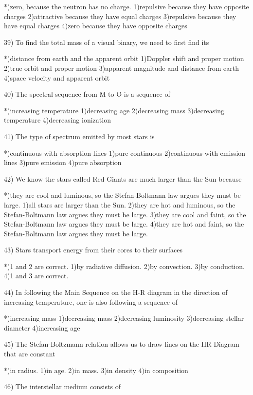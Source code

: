  *)zero, because the neutron has no charge.  
 1)repulsive because they have opposite charges
 2)attractive because they have equal charges
 3)repulsive because they have equal charges
 4)zero because they have opposite charges
 
39) To find the total mass of a visual binary, we need to first find its
 
 *)distance from earth and the apparent orbit
 1)Doppler shift and proper motion
 2)true orbit and proper motion
 3)apparent magnitude and distance from earth
 4)space velocity and apparent orbit
 
40) The spectral sequence from M to O is a sequence of
 
 *)increasing temperature
 1)decreasing age
 2)decreasing mass
 3)decreasing temperature
 4)decreasing ionization
 
41) The type of spectrum emitted by most stars is
 
 *)continuous with absorption lines
 1)pure continuous
 2)continuous with emission lines
 3)pure emission
 4)pure absorption
 
42) We know the stars called Red Giants are much larger than the Sun
    because
 
 *)they are cool and luminous, so the Stefan-Boltmann law argues they
   must be large.
 1)all stars are larger than the Sun.
 2)they are hot and luminous, so the Stefan-Boltmann law argues they
   must be large.
 3)they are cool and faint, so the Stefan-Boltmann law argues they
   must be large.
 4)they are hot and faint, so the Stefan-Boltmann law argues they
   must be large.
 
43) Stars transport energy from their cores to their surfaces
 
 *)1 and 2 are correct.
 1)by radiative diffusion.
 2)by convection.
 3)by conduction.
 4)1 and 3 are correct.
 
44) In following the Main Sequence on the H-R diagram in the direction of
    increasing temperature, one is also following a sequence of
 
 *)increasing mass
 1)decreasing mass
 2)decreasing luminosity
 3)decreasing stellar diameter
 4)increasing age
 
45) The Stefan-Boltzmann relation allows us to draw lines on the HR 
    Diagram that are constant
 
 *)in radius.
 1)in age.
 2)in mass.
 3)in density
 4)in composition
 
46) The interstellar medium consists of
 
